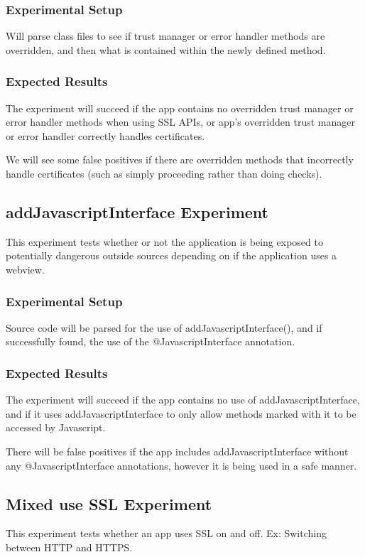\documentclass[10pt,twocolumn,pdftex]{article}
\begin{document}
    \subsubsection{Experimental Setup}
    Will parse class files to see if trust manager or error handler methods are overridden, and then what is contained within the newly defined method. 

    \subsubsection{Expected Results}
    The experiment will succeed if the app contains no overridden trust manager or error handler methods when using SSL APIs, or app’s overridden trust manager or error handler correctly handles certificates.

    We will see some false positives if there are overridden methods that incorrectly handle certificates (such as simply proceeding rather than doing checks).


\subsection{addJavascriptInterface Experiment}
This experiment tests whether or not the application is being exposed to potentially dangerous outside sources depending on if the application uses a webview.

    \subsubsection{Experimental Setup}
    Source code will be parsed for the use of addJavascriptInterface(), and if successfully found, the use of the @JavascriptInterface annotation.

    \subsubsection{Expected Results}
    The experiment will succeed if the app contains no use of addJavascriptInterface, and if it uses addJavascriptInterface to only allow methods marked with it to be accessed by Javascript.

    There will be false positives if the app includes addJavascriptInterface without any @JavascriptInterface annotations, however it is being used in a safe manner.


\subsection{Mixed use SSL Experiment}
This experiment tests whether an app uses SSL on and off. Ex: Switching between HTTP and HTTPS.
\end{document}
